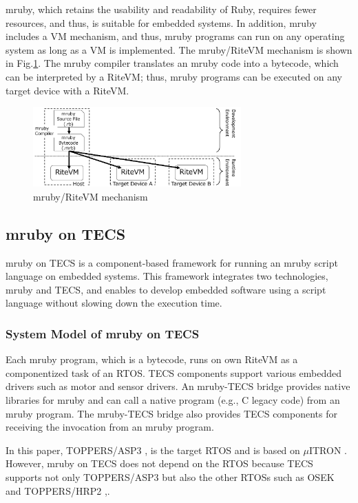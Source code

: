 \documentclass[JIP]{ipsj_v2/UTF8/ipsj}
\begin{document}
mruby, which retains the usability and readability of Ruby, requires fewer resources, and thus, is suitable for embedded systems.
In addition, mruby includes a VM mechanism, and thus, mruby programs can run on any operating system as long as a VM is implemented.
The mruby/RiteVM mechanism is shown in Fig.\ref{fig:mruby}.
The mruby compiler translates an mruby code into a bytecode, which can be interpreted by a RiteVM; thus, mruby programs can be executed on any target device with a RiteVM.

\begin{figure}[t]
    \centering
    \includegraphics[width=8cm,clip]{figure/mruby.pdf}
    \caption{mruby/RiteVM mechanism}
    \label{fig:mruby}
\end{figure}


\subsection{mruby on TECS}
\label{sec:mrubyonTECS}

mruby on TECS is a component-based framework for running an mruby script language on embedded systems.
This framework integrates two technologies, mruby and TECS, and enables to develop embedded software using a script language without slowing down the execution time. 

\subsubsection{System Model of mruby on TECS}
Each mruby program, which is a bytecode, runs on own RiteVM as a componentized task of an RTOS.
TECS components support various embedded drivers such as motor and sensor drivers.
An mruby-TECS bridge provides native libraries for mruby and can call a native program (e.g., C legacy code) from an mruby program.
The mruby-TECS bridge also provides TECS components for receiving the invocation from an mruby program.

In this paper, TOPPERS/ASP3 \cite{par:ASP3},\cite{url:ASP3} is the target RTOS and is based on $\mu$ITRON \cite{par:microITRON} .
However, mruby on TECS does not depend on the RTOS because TECS supports not only TOPPERS/ASP3 but also the other RTOSs such as OSEK \cite{par:OSEK} and TOPPERS/HRP2 \cite{url:HRP2},\cite{par:hr-tecs}.
\end{document}

